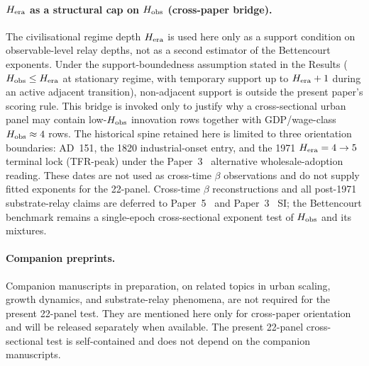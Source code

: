 \paragraph{$H_{\rm era}$ as a structural cap on $H_{\rm obs}$ (cross-paper bridge).}
The civilisational regime depth \(H_{\rm era}\) is used here only as a support condition on observable-level relay depths, not as a second estimator of the Bettencourt exponents. Under the support-boundedness assumption stated in the Results (\(H_{\rm obs}\leq H_{\rm era}\) at stationary regime, with temporary support up to \(H_{\rm era}+1\) during an active adjacent transition), non-adjacent support is outside the present paper's scoring rule. This bridge is invoked only to justify why a cross-sectional urban panel may contain low-\(H_{\rm obs}\) innovation rows together with GDP/wage-class \(H_{\rm obs}\approx4\) rows. The historical spine retained here is limited to three orientation boundaries: AD~151, the 1820 industrial-onset entry, and the 1971 \(H_{\rm era}=4\to5\) terminal lock (TFR-peak) under the Paper~3~\cite{Kato2026c} alternative wholesale-adoption reading. These dates are not used as cross-time \(\beta\) observations and do not supply fitted exponents for the 22-panel. Cross-time \(\beta\) reconstructions and all post-1971 substrate-relay claims are deferred to Paper~5~\cite{Kato2026e} and Paper~3~\cite{Kato2026c} SI; the Bettencourt benchmark remains a single-epoch cross-sectional exponent test of \(H_{\rm obs}\) and its mixtures.

\paragraph{Companion preprints.}
Companion manuscripts in preparation, on related topics in urban scaling, growth dynamics, and substrate-relay phenomena, are not required for the present 22-panel test. They are mentioned here only for cross-paper orientation and will be released separately when available. The present 22-panel cross-sectional test is self-contained and does not depend on the companion manuscripts.

